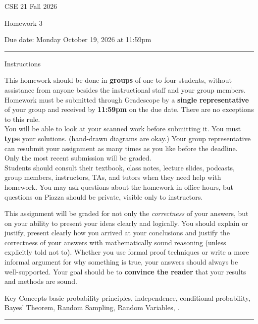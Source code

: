 \documentclass[10pt,letterpaper,unboxed,cm]{article}
\begin{document}
\hfill{CSE 21 Fall 2026}

\hfill{Homework 3}

\hfill{Due date: Monday October 19, 2026 at 11:59pm}

\begin{center}
\begin{minipage}[t]{5.7in}
\rule{\linewidth}{2pt}
{\sc Instructions}\newline

This homework should be done in {\bf groups} of one to four students, without assistance from anyone besides the instructional staff and your group members.  Homework must be submitted through Gradescope by a {\bf single representative} of your group and received by {\bf 11:59pm} on the due date. There are no exceptions to this rule.\\
 
You will be able to look at your scanned work before submitting it. 
 You must {\bf type} your solutions. (hand-drawn diagrams are okay.)
 Your group representative can resubmit your assignment as many times as you like before the deadline. Only the most recent submission will be graded.\\

Students should consult their textbook, class notes, lecture slides, podcasts, group members, instructors, TAs, and tutors when 
they need help with homework. You may ask questions about the homework in office hours, but questions on Piazza should be private, visible only to instructors. 

This assignment will be graded for not only the \emph{correctness} of your answers, but on your ability to present your ideas clearly and logically. You should explain or justify, present clearly how you arrived at your conclusions and justify the correctness of your answers with mathematically sound reasoning (unless explicitly told not to). Whether you use formal proof techniques or write a more informal argument for why something is true, your answers should always be well-supported. Your goal should be to {\bf convince the reader} that your results and methods are sound.






{\sc Key Concepts}  basic probability principles,
independence, conditional probability, Bayes’ Theorem, Random Sampling, Random Variables, .



\rule{\linewidth}{2pt}
\end{minipage} \hfill

\end{center}
\end{document}
